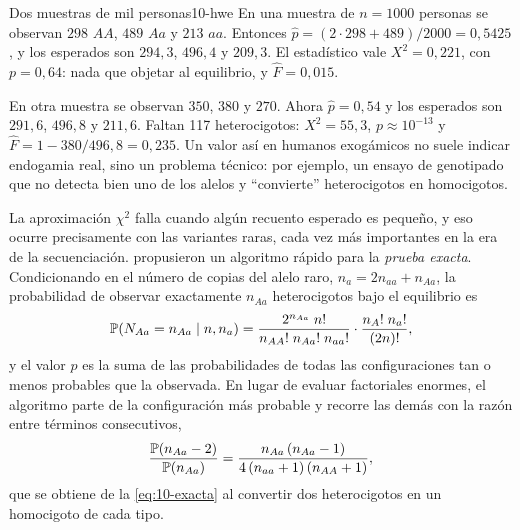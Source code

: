 \begin{ejemplo}{Dos muestras de mil personas}{10-hwe}
En una muestra de $n=1000$ personas se observan $298$ $AA$, $489$ $Aa$ y $213$ $aa$. Entonces $\hat p=(2\cdot298+489)/2000=0{,}5425$, y los esperados son $294{,}3$, $496{,}4$ y $209{,}3$. El estadístico vale $X^2=0{,}221$, con $p=0{,}64$: nada que objetar al equilibrio, y $\hat F=0{,}015$.

En otra muestra se observan $350$, $380$ y $270$. Ahora $\hat p=0{,}54$ y los esperados son $291{,}6$, $496{,}8$ y $211{,}6$. Faltan 117 heterocigotos: $X^2=55{,}3$, $p\approx10^{-13}$ y $\hat F=1-380/496{,}8=0{,}235$. Un valor así en humanos exogámicos no suele indicar endogamia real, sino un problema técnico: por ejemplo, un ensayo de genotipado que no detecta bien uno de los alelos y ``convierte'' heterocigotos en homocigotos.
\end{ejemplo}

La aproximación $\chi^2$ falla cuando algún recuento esperado es pequeño, y eso ocurre precisamente con las variantes raras, cada vez más importantes en la era de la secuenciación. \textcite{c10-wigginton2005} propusieron un algoritmo rápido para la \emph{prueba exacta}. Condicionando en el número de copias del alelo raro, $n_a=2n_{aa}+n_{Aa}$, la probabilidad de observar exactamente $n_{Aa}$ heterocigotos bajo el equilibrio es
\begin{equation}\label{eq:10-exacta}
\mathbb{P}(N_{Aa}=n_{Aa}\mid n,n_a) = \frac{2^{n_{Aa}}\; n!}{n_{AA}!\; n_{Aa}!\; n_{aa}!}\cdot\frac{n_A!\;n_a!}{(2n)!},
\end{equation}
y el valor $p$ es la suma de las probabilidades de todas las configuraciones tan o menos probables que la observada. En lugar de evaluar factoriales enormes, el algoritmo parte de la configuración más probable y recorre las demás con la razón entre términos consecutivos,
\begin{equation}\label{eq:10-recurrencia}
\frac{\mathbb{P}(n_{Aa}-2)}{\mathbb{P}(n_{Aa})} = \frac{n_{Aa}\,(n_{Aa}-1)}{4\,(n_{aa}+1)\,(n_{AA}+1)},
\end{equation}
que se obtiene de la \cref{eq:10-exacta} al convertir dos heterocigotos en un homocigoto de cada tipo.

\begin{simbolos}
\end{simbolos}

